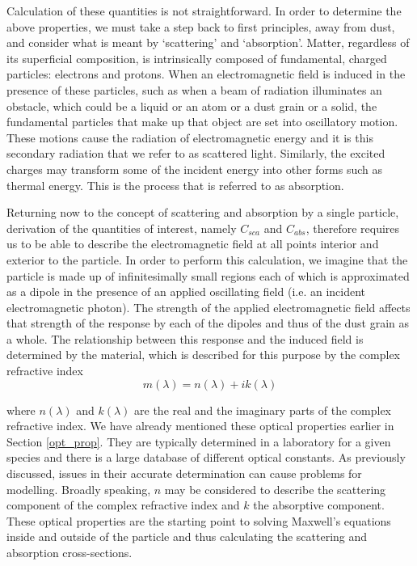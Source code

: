 Calculation of these quantities is not straightforward.  In order to determine the above properties, we must take a step back to first principles, away from dust, and consider what is meant by `scattering' and `absorption'.  Matter, regardless of its superficial composition, is intrinsically composed of fundamental, charged particles: electrons and protons.  When an electromagnetic field is induced in the presence of these particles, such as when a beam of radiation illuminates an obstacle, which could be a liquid or an atom or a dust grain or a solid, the fundamental particles that make up that object are set into oscillatory motion.  These motions cause the radiation of electromagnetic energy and it is this secondary radiation that we refer to as scattered light.  Similarly, the excited charges may transform some of the incident energy into other forms such as thermal energy.  This is the process that is referred to as absorption.

Returning now to the concept of scattering and absorption by a single particle, derivation of the quantities of interest, namely $C_{sca}$ and $C_{abs}$, therefore requires us to be able to describe the electromagnetic field at all points interior and exterior to the particle.  In order to perform this calculation, we imagine that the particle is made up of infinitesimally small regions each of which is approximated as a dipole in the presence of an applied oscillating field (i.e. an incident electromagnetic photon).  The strength of the applied electromagnetic field affects that strength of the response by each of the dipoles and thus of the dust grain as a whole.  The relationship between this response and the induced field is determined by the material, which is described for this purpose by the complex refractive index 
\begin{equation}
m(\lambda)=n(\lambda)+ik(\lambda)
\end{equation}

\noindent where $n(\lambda)$ and $k(\lambda)$ are the real and the imaginary parts of the complex refractive index.  We have already mentioned these optical properties earlier in Section \ref{opt_prop}.  They are typically determined in a laboratory for a given species and there is a large database of different optical constants.  As previously discussed, issues in their accurate determination can cause problems for modelling.  Broadly speaking, $n$ may be considered to describe the scattering component of the complex refractive index and $k$ the absorptive component.  These optical properties are the starting point to solving Maxwell's equations inside and outside of the particle and thus calculating the scattering and absorption cross-sections.

